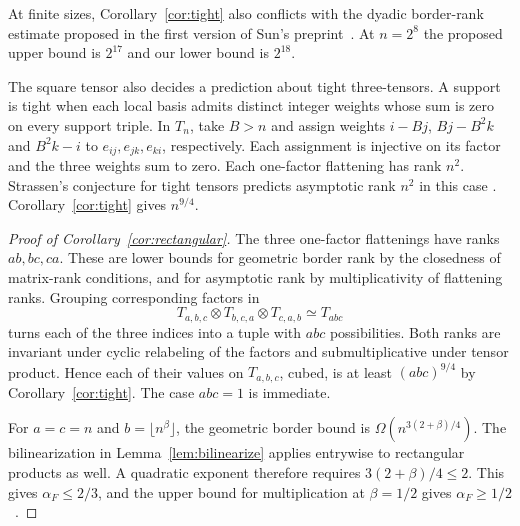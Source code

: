 At finite sizes, Corollary~\ref{cor:tight} also conflicts with the dyadic
border-rank estimate proposed in the first version of Sun's
preprint~\cite{Sun}. At $n=2^8$ the proposed upper bound is $2^{17}$
and our lower bound is $2^{18}$.

The square tensor also decides a prediction about tight three-tensors.
A support is tight when each local basis admits distinct integer
weights whose sum is zero on every support triple. In \(T_n\), take
\(B>n\) and assign weights \(i-Bj\), \(Bj-B^2k\) and \(B^2k-i\)
to \(e_{ij},e_{jk},e_{ki}\), respectively. Each assignment is
injective on its factor and the three weights sum to zero. Each
one-factor flattening has rank \(n^2\). Strassen's conjecture for
tight tensors predicts asymptotic rank \(n^2\) in this case
\cite[Conjecture~5.3]{Strassen1994}. Corollary~\ref{cor:tight}
gives \(n^{9/4}\).

\begin{proof}[Proof of Corollary~\ref{cor:rectangular}]
The three one-factor flattenings have ranks \(ab,bc,ca\).
These are lower bounds for geometric border rank by the closedness
of matrix-rank conditions, and for asymptotic rank by multiplicativity
of flattening ranks. Grouping corresponding factors in
\[
            T_{a,b,c}\otimes T_{b,c,a}\otimes T_{c,a,b}
                                \simeq T_{abc}
\]
turns each of the three indices into a tuple with \(abc\) possibilities.
Both ranks are invariant under cyclic relabeling of the factors and
submultiplicative under tensor product. Hence each of their values
on \(T_{a,b,c}\), cubed, is at least \((abc)^{9/4}\) by
Corollary~\ref{cor:tight}. The case \(abc=1\) is immediate.

For \(a=c=n\) and \(b=\lfloor n^\beta\rfloor\), the geometric border
bound is \(\Omega(n^{3(2+\beta)/4})\). The bilinearization in
Lemma~\ref{lem:bilinearize} applies entrywise to rectangular products
as well. A quadratic exponent therefore requires \(3(2+\beta)/4\le2\).
This gives \(\alpha_F\le2/3\), and the upper bound for multiplication
at \(\beta=1/2\) gives \(\alpha_F\ge1/2\)~\cite{abvz}.
\end{proof}
